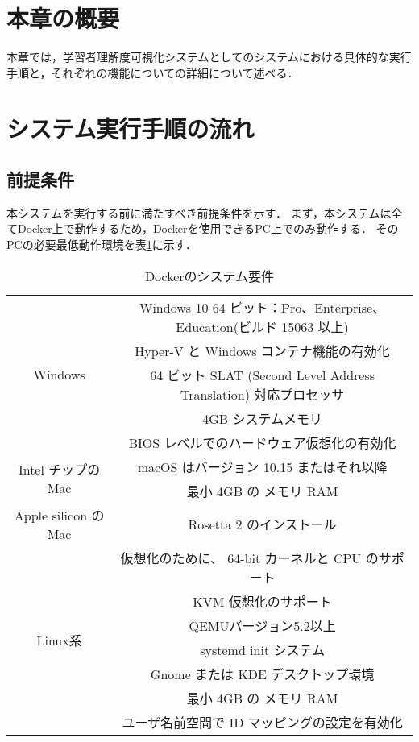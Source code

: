 \section{本章の概要}
本章では，学習者理解度可視化システムとしてのシステムにおける具体的な実行手順と，それぞれの機能についての詳細について述べる．

\section{システム実行手順の流れ}
\subsection{前提条件}
本システムを実行する前に満たすべき前提条件を示す．
まず，本システムは全てDocker上で動作するため，Dockerを使用できるPC上でのみ動作する．
そのPCの必要最低動作環境を表\ref{tab:docker_env}に示す．

\begin{table}[htb]
    \centering
    \caption{Dockerのシステム要件}
    \label{tab:docker_env}
    \begin{tabular}{|c|c|}  \hline
        \multirow{5}{*}{Windows} & Windows 10 64 ビット：Pro、Enterprise、Education(ビルド 15063 以上) \\
		              & Hyper-V と Windows コンテナ機能の有効化 \\ 
                      & 64 ビット SLAT (Second Level Address Translation) 対応プロセッサ \\ 
                      & 4GB システムメモリ \\ 
                      & BIOS レベルでのハードウェア仮想化の有効化 \\ \hline
        \multirow{2}{*}{Intel チップの Mac} & macOS はバージョン 10.15 またはそれ以降 \\
        & 最小 4GB の メモリ RAM \\ \hline
        Apple silicon の Mac & Rosetta 2 のインストール \\ \hline
        \multirow{7}{*}{Linux系} & 仮想化のために、 64-bit カーネルと CPU のサポート \\
        & KVM 仮想化のサポート \\ 
        & QEMUバージョン5.2以上 \\
        & systemd init システム \\ 
        & Gnome または KDE デスクトップ環境 \\ 
        & 最小 4GB の メモリ RAM \\
        & ユーザ名前空間で ID マッピングの設定を有効化 \\ \hline
    \end{tabular}
\end{table}